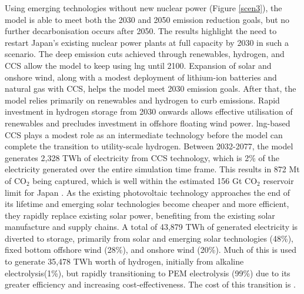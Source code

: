 Using emerging technologies without new nuclear power (Figure \ref{scen3}), the model is able to meet both the 2030 and 2050 emission reduction goals, but no further decarbonisation occurs after 2050. The results highlight the need to restart Japan's existing nuclear power plants at full capacity by 2030 in such a scenario. The deep emission cuts achieved through renewables, hydrogen, and \gls{CCS} allow the model to keep using \gls{lng} until 2100. Expansion of solar and onshore wind, along with a modest deployment of lithium-ion batteries and natural gas with \gls{CCS}, helps the model meet 2030 emission goals. After that, the model relies primarily on renewables and hydrogen to curb emissions. Rapid investment in hydrogen storage from 2030 onwards allows effective utilisation of renewables and precludes investment in offshore floating wind power. \gls{lng}-based \gls{CCS} plays a modest role as an intermediate technology before the model can complete the transition to utility-scale hydrogen. Between 2032-2077, the model generates 2,328 TWh  of electricity from \gls{CCS} technology, which is 2\% of the electricity generated over the entire simulation time frame. This results in 872 Mt of CO$_2$ being captured, which is well within the estimated 156 Gt CO$_2$ reservoir limit for Japan \cite{kato_energy_2016}. As the existing photovoltaic technology approaches the end of its lifetime and emerging solar technologies become cheaper and more efficient, they rapidly replace existing solar power, benefiting from the existing solar manufacture and supply chains. A total of 43,879 TWh of generated electricity is diverted to storage, primarily from solar and emerging solar technologies (48\%), fixed bottom offshore wind (28\%), and onshore wind (20\%). Much of this is used to generate 35,478 TWh worth of hydrogen, initially from alkaline electrolysis(1\%), but rapidly transitioning to PEM electrolysis (99\%) due to its greater efficiency and increasing cost-effectiveness. The cost of this transition is  .

